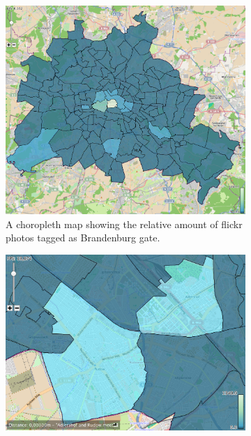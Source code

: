 \begin{figure}[t]
		\centering
		\begin{subfigure}[b]{0.225\textwidth}
                \centering
                \includegraphics[width=\textwidth]{imgs/flickr}
                \caption{A choropleth map showing the relative amount of flickr photos tagged
                as Brandenburg gate.}
                \label{fig:flickr}
        \end{subfigure}
        \hspace*{0.02\textwidth}
        \begin{subfigure}[b]{0.225\textwidth}
				\centering
				\includegraphics[width=\textwidth]{imgs/rel}

\end{subfigure}
\end{figure}
